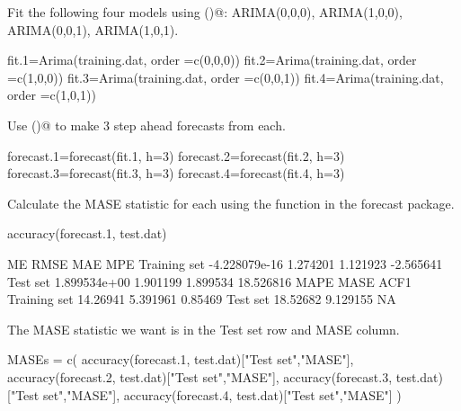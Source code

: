 \begin{wideenumerate}
\item Fit the following four models using \verb@Arima()@: ARIMA(0,0,0), ARIMA(1,0,0), ARIMA(0,0,1), ARIMA(1,0,1).

\begin{Schunk}
\begin{Sinput}
 fit.1=Arima(training.dat, order =c(0,0,0))
 fit.2=Arima(training.dat, order =c(1,0,0))
 fit.3=Arima(training.dat, order =c(0,0,1))
 fit.4=Arima(training.dat, order =c(1,0,1))
\end{Sinput}
\end{Schunk}

\item Use \verb@forecast()@ to make 3 step ahead forecasts from each.

\begin{Schunk}
\begin{Sinput}
 forecast.1=forecast(fit.1, h=3)
 forecast.2=forecast(fit.2, h=3)
 forecast.3=forecast(fit.3, h=3)
 forecast.4=forecast(fit.4, h=3)
\end{Sinput}
\end{Schunk}

\item Calculate the MASE statistic for each using the \verb@accuracy@ function in the forecast package. 
 
\begin{Schunk}
\begin{Sinput}
 accuracy(forecast.1, test.dat)
\end{Sinput}
\begin{Soutput}
                        ME     RMSE      MAE       MPE
Training set -4.228079e-16 1.274201 1.121923 -2.565641
Test set      1.899534e+00 1.901199 1.899534 18.526816
                 MAPE     MASE    ACF1
Training set 14.26941 5.391961 0.85469
Test set     18.52682 9.129155      NA
\end{Soutput}
\end{Schunk}
The MASE statistic we want is in the Test set row and MASE column.  
\begin{Schunk}
\begin{Sinput}
 MASEs = c(
   accuracy(forecast.1, test.dat)["Test set","MASE"],
   accuracy(forecast.2, test.dat)["Test set","MASE"],
   accuracy(forecast.3, test.dat)["Test set","MASE"],
   accuracy(forecast.4, test.dat)["Test set","MASE"]
 )
\end{Sinput}
\end{Schunk}


\end{wideenumerate}
